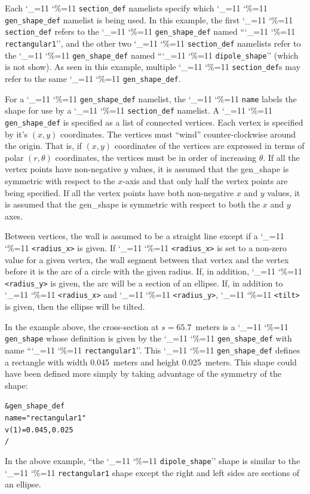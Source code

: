 \documentclass[11pt]{article}
\newcommand\ttcmd{\begingroup\catcode`\_=11 \catcode`\%=11 \dottcmd}
\newcommand\dottcmd[1]{\texttt{#1}\endgroup}
\newcommand{\vn}{\ttcmd}
\newlength{\ExBeg}
\newlength{\ExEnd}
\newenvironment{example}
  {\vspace{\ExBeg} \begin{alltt}}
  {\end{alltt} \vspace{\ExEnd}}
\begin{document}
Each \vn{section_def} namelists specify which \vn{gen_shape_def}
namelist is being used. In this example, the first \vn{section_def}
refers to the \vn{gen_shape_def} named ``\vn{rectangular1}'', and the
other two \vn{section_def} namelists refer to the \vn{gen_shape_def}
named ``\vn{dipole_shape}'' (which is not show). As seen in this
example, multiple \vn{section_def}s may refer to the same
\vn{gen_shape_def}.

For a \vn{gen_shape_def} namelist, the \vn{name} labels the shape for
use by a \vn{section_def} namelist.  A \vn{gen_shape_def} is specified
as a list of connected vertices. Each vertex is specified by it's $(x,
y)$ coordinates. The vertices must ``wind'' counter-clockwise around
the origin. That is, if $(x, y)$ coordinates of the vertices are
expressed in terms of polar $(r, \theta)$ coordinates, the vertices
must be in order of increasing $\theta$. If all the vertex points have
non-negative $y$ values, it is assumed that the gen_shape is symmetric
with respect to the $x$-axis and that only half the vertex points are
being specified. If all the vertex points have both non-negative $x$
and $y$ values, it is assumed that the gen_shape is symmetric with
respect to both the $x$ and $y$ axes.

Between vertices, the wall is assumed to be a straight line except if
a \vn{<radius_x>} is given. If \vn{<radius_x>} is set to a non-zero
value for a given vertex, the wall segment between that vertex and the
vertex before it is the arc of a circle with the given radius. If, in
addition, \vn{<radius_y>} is given, the arc will be a section of an
ellipse.  If, in addition to \vn{<radius_x>} and \vn{<radius_y>},
\vn{<tilt>} is given, then the ellipse will be tilted.

In the example above, the cross-section at $s = 65.7$~meters is a
\vn{gen_shape} whose definition is given by the \vn{gen_shape_def}
with name ``\vn{rectangular1}''.  This \vn{gen_shape_def} defines a rectangle
with width 0.045~meters and height 0.025~meters. This shape could have been
defined more simply by taking advantage of the symmetry of the shape: 
\begin{example}
  &gen_shape_def
    name = "rectangular1"
    v(1) =  0.045,  0.025
  /
\end{example}

In the above example, ``the \vn{dipole_shape}'' shape is similar to
the \vn{rectangular1} shape except the right and left sides are
sections of an ellipse.
\end{document}
